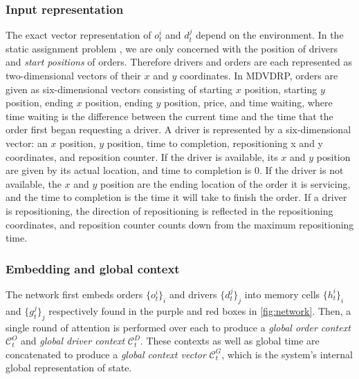 \subsubsection{Input representation}
The exact vector representation of $o_t^i$ and $d_t^j$ depend on the environment. In the static assignment problem \cite{munkres1957algorithms}, we are only concerned with the position of drivers and {\em start positions} of orders. Therefore drivers and orders are each represented as two-dimensional vectors of their $x$ and $y$ coordinates. In MDVDRP, orders are given as six-dimensional vectors consisting of starting $x$ position, starting $y$ position, ending $x$ position, ending $y$ position, price, and time waiting, where time waiting is the difference between the current time and the time that the order first began requesting a driver. A driver is represented by a six-dimensional vector: an $x$ position, $y$ position, time to completion, repositioning x and y coordinates, and reposition counter. If the driver is available, its $x$ and $y$ position are given by its actual location, and time to completion is 0. If the driver is not available, the $x$ and $y$ position are the ending location of the order it is servicing, and the time to completion is the time it will take to finish the order. If a driver is repositioning, the direction of repositioning is reflected in the repositioning coordinates, and reposition counter counts down from the maximum repositioning time.

\subsubsection{Embedding and global context}
The network first embeds orders $\{o_t^i\}_i$ and drivers $\{d_t^j\}_j$ into memory cells $\{h_t^i\}_i$ and $\{g_t^j\}_j$ respectively found in the purple and red boxes in \cref{fig:network}. Then, a single round of attention is performed over each to produce a {\em global order context} $\mathcal{C}_t^O$ and {\em global driver context } $\mathcal{C}_t^D$. These contexts as well as global time are concatenated to produce a {\em global context vector} $\mathcal{C}_t^G$, which is the system's internal global representation of state.

